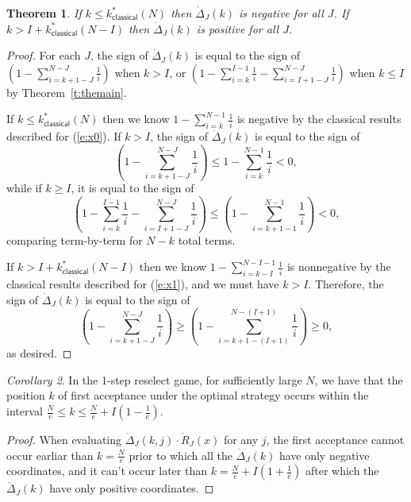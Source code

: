 \documentclass[11pt]{amsart}   %
\newtheorem{theorem}{Theorem}[section]
\theoremstyle{definition}
\theoremstyle{remark}
\numberwithin{equation}{section}
\theoremstyle{theorem}
\newtheorem{corollary}[theorem]{Corollary}
\begin{document}
\begin{theorem}
If $k \leq k^\ast_{\mathsf{classical}}(N)$ then $\dot\Delta_J(k)$ is negative for all $J$.  If $k > I + k^\ast_{\mathsf{classical}}(N-I)$ then $\dot\Delta_J(k)$ is positive for all $J$.
\end{theorem}
\begin{proof}
For each $J$, the sign of $\dot\Delta_J(k)$ is equal to the sign of $\left( 1-\sum_{i=k+1-J}^{N-J} \frac{1}{i} \right)$ when $k > I$, or $\left( 1-\sum_{i=k}^{I-1} \frac{1}{i}-\sum_{i=I+1-J}^{N-J} \frac{1}{i} \right)$ when $k \leq I$ by Theorem~\ref{t:themain}.

If $k \leq k^\ast_{\mathsf{classical}}(N)$ then we know $1 - \sum_{i=k}^{N-1} \frac{1}{i}$ is negative by the classical results described for (\ref{e:x0}).  If $k > I$, the sign of $\dot\Delta_J(k)$ is equal to the sign of 
\[ \left( 1-\sum_{i=k+1-J}^{N-J} \frac{1}{i} \right) \leq 1 - \sum_{i=k}^{N-1} \frac{1}{i} < 0, \]
while if $k \geq I$, it is equal to the sign of 
\[ \left( 1-\sum_{i=k}^{I-1} \frac{1}{i}-\sum_{i=I+1-J}^{N-J} \frac{1}{i} \right) \leq \left( 1-\sum_{i=k+1-1}^{N-1} \frac{1}{i} \right) < 0, \]
comparing term-by-term for $N-k$ total terms.

If $k > I + k^\ast_{\mathsf{classical}}(N-I)$ then we know $1 - \sum_{i=k-I}^{N-I-1} \frac{1}{i}$ is nonnegative by the classical results described for (\ref{e:x1}), and we must have $k > I$.  Therefore, the sign of $\dot\Delta_J(k)$ is equal to the sign of 
\[
 \left( 1-\sum_{i=k+1-J}^{N-J} \frac{1}{i} \right) \geq \left( 1-\sum_{i=k+1-(I+1)}^{N-(I+1)} \frac{1}{i} \right) \geq 0,
\]
as desired.
\end{proof}

\begin{corollary}\label{c:band}
In the 1-step reselect game, for sufficiently large $N$, we have that the position $k$ of first acceptance under the optimal strategy occurs within the interval $\frac{N}{e} \leq k \leq \frac{N}{e} + I \left(1-\frac{1}{e}\right)$.
\end{corollary}
\begin{proof}
When evaluating $\dot\Delta_J(k,j) \cdot \dot{R}_J(x)$ for any $j$, the first acceptance cannot occur earliar than $k = \frac{N}{e}$ prior to which all the $\dot\Delta_J(k)$ have only negative coordinates, and it can't occur later than $k = \frac{N}{e} + I \left(1 + \frac{1}{e}\right)$ after which the $\dot\Delta_J(k)$ have only positive coordinates.
\end{proof}
\end{document}

